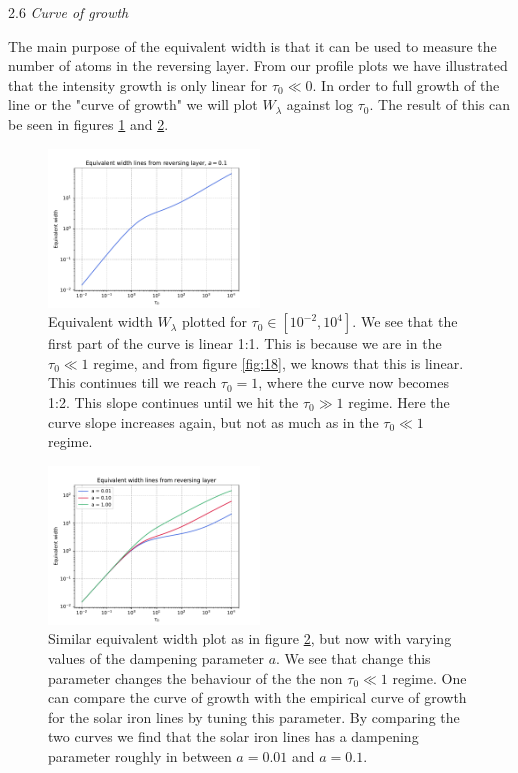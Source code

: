 \documentclass[a4paper,11.5pt,]{article}
\begin{document}
\begin{multicols}{2}
\begin{center}
2.6\textit{ Curve of growth}
\end{center}
The main purpose of the equivalent width is that it can be used to measure the number of atoms in the reversing layer. From our profile plots we have illustrated that the intensity growth is only linear for $\tau_0 \ll 0$. In order to full growth of the line or the "curve of growth" we will plot $W_\lambda$ against log $\tau_0$. The result of this can be seen in figures \ref{fig:27} and \ref{fig:28}.

\begin{figure}[H]
	\centering
	\includegraphics[width=0.5\textwidth]{SSA/figures/growth.pdf}
	\caption{Equivalent width $W_\lambda$ plotted for $\tau_0 \in [10^{-2}, 10^4]$. We see that the first part of the curve is linear 1:1. This is because we are in the $\tau_0 \ll 1$ regime, and from figure \ref{fig:18}, we knows that this is linear. This continues till we reach $\tau_0 = 1$, where the curve now becomes 1:2. This slope continues until we hit the $\tau_0 \gg 1$ regime. Here the curve slope increases again, but not as much as in the $\tau_0 \ll 1$ regime.}
	\label{fig:27}
\end{figure}

\begin{figure}[H]
	\centering
	\includegraphics[width=0.5\textwidth]{SSA/figures/growthmulti.pdf}
	\caption{Similar equivalent width plot as in figure \ref{fig:28}, but now with varying values of the dampening parameter $a$. We see that change this parameter changes the behaviour of the the non $\tau_0 \ll 1$ regime. One can compare the curve of growth with the empirical curve of growth for the solar iron lines by tuning this parameter. By comparing the two curves we find that the solar iron lines has a dampening parameter roughly in between $a = 0.01$ and $a = 0.1$. }
	\label{fig:28}
\end{figure}

\end{multicols}
\end{document}
